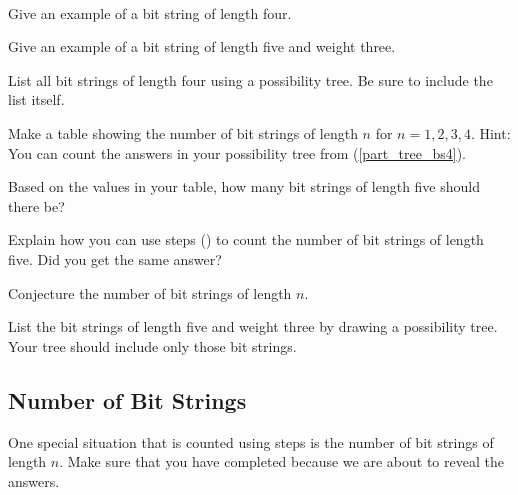 \begin{act} 
\label{act_listing_bit_strings}
    ~ 
     \begin{actpart}         
         \item Give an example of a bit string of length four.
         \item Give an example of a bit string of length five and weight three.
         \item \label{part_tree_bs4} List all bit strings of length four using a possibility tree.  Be sure to include the list itself.
         \item Make a table showing the number of bit strings of length $n$ for $n= 1, 2, 3, 4$.  Hint: You can count the answers in your possibility tree from (\ref{part_tree_bs4}).   
         \item Based on the values in your table, how many bit strings of length five should there be?
         \item Explain how you can use steps () to count the number of bit strings of length five. Did you get the same answer?
         \item Conjecture the number of bit strings of length $n$.        
         \item \label{part_bit_strings_length5_weight3} List the bit strings of length five and weight three by drawing a possibility tree. Your tree should include only those bit strings.
    \end{actpart}
\end{act}


\newcommand{\subcountbitstrings}{Number of Bit Strings}
\subsection{\subcountbitstrings}
\label{sub_count_bit_strings}

One special situation that is counted using steps is the number of bit strings of length $n$.  Make sure that you have completed  because we are about to reveal the answers.

